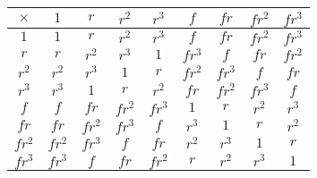 \documentclass{report}
\begin{document}
{    \begin{tabular}{|c|c c c c c c c c|}
      \hline
      $\times $&$ 1 $&$ r  $&$ r^2 $&$ r^3 $&$ f $&$ fr $&$ fr^2 $&$ fr^3  $\\ 
      \hline
      $1    $&$ 1 $&$ r $&$ r^2 $&$ r^3    $&$ f $&$ fr $&$ fr^2 $&$ fr^3 $\\ 
      $r    $&$ r $&$ r^2 $&$ r^3 $&$ 1    $&$ fr^3 $&$ f $&$ fr $&$ fr^2 $\\     
      $r^2  $&$ r^2 $&$ r^3 $&$ 1 $&$ r    $&$ fr^2 $&$ fr^3 $&$ f $&$ fr $\\ 
      $r^3  $&$ r^3 $&$ 1 $&$ r $&$ r^2    $&$ fr $&$ fr^2 $&$ fr^3 $&$ f $\\ 
      $f    $&$ f $&$ fr $&$ fr^2 $&$ fr^3 $&$ 1 $&$ r $&$ r^2 $&$ r^3    $\\
      $fr   $&$ fr $&$ fr^2 $&$ fr^3 $&$ f $&$ r^3 $&$ 1 $&$ r $&$ r^2    $\\ 
      $fr^2 $&$ fr^2 $&$ fr^3 $&$ f $&$ fr $&$ r^2 $&$ r^3 $&$ 1 $&$ r    $\\
      $fr^3 $&$ fr^3 $&$ f $&$ fr $&$ fr^2 $&$ r $&$ r^2 $&$ r^3 $&$ 1    $\\ 
      \hline
    \end{tabular}
  }

\end{document}
